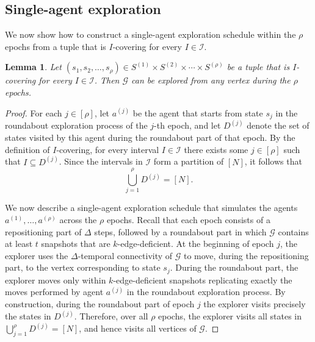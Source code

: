 \documentclass[a4paper,11pt]{article}
\newtheorem{lemma}[theorem]{Lemma}
\theoremstyle{definition}
\theoremstyle{remark}
\newcommand{\cG}{\ensuremath{\mathcal{G}}}
\newcommand{\bfI}{\ensuremath{\mathcal{I}}}
\begin{document}
	 \subsection{Single-agent exploration}\label{sec:single-agent-exploration}
 	
 	We now show how to construct a single-agent exploration schedule within the $\rho$ epochs from 
    a tuple that is  $I$-covering for every $I \in \bfI$.
 	
 	\begin{lemma}\label{lem:tuple-to-exploration}
 		Let $(s_1, s_2, \ldots, s_{\rho}) \in S^{(1)} \times S^{(2)} \times \cdots \times S^{(\rho)}$ be a tuple that is $I$-covering for every $I \in \bfI$. Then $\cG$ can be explored from any vertex during the $\rho$ epochs.
 	\end{lemma}
	\begin{proof}
        For each $j \in [\rho]$, let $a^{(j)}$ be the agent that starts from state $s_j$ in
        the roundabout exploration process of the $j$-th epoch, and let $D^{(j)}$ denote the
        set of states visited by this agent during the roundabout part of that epoch.
        By the definition of $I$-covering, for every interval $I \in \bfI$ there
        exists some $j \in [\rho]$ such that $I \subseteq D^{(j)}$.
        Since the intervals in $\bfI$ form a partition of $[N]$, it follows that
        \[
        \bigcup_{j=1}^{\rho} D^{(j)} = [N].
        \]
        
        We now describe a single-agent exploration schedule that simulates the agents
        $a^{(1)},\dots,a^{(\rho)}$ across the $\rho$ epochs.
        Recall that each epoch consists of a repositioning part of $\Delta$ steps, followed by a roundabout part in which $\cG$ contains at least $t$ snapshots that are $k$-edge-deficient.
        At the beginning of epoch $j$, the explorer uses the $\Delta$-temporal connectivity
        of $\cG$ to move, during the repositioning part, to the vertex corresponding to state
        $s_j$.
        During the roundabout part, the explorer moves only within $k$-edge-deficient snapshots replicating exactly the
        moves performed by agent $a^{(j)}$ in the roundabout exploration process.
%
        By construction, during the roundabout part of epoch $j$ the explorer visits
        precisely the states in $D^{(j)}$.
        Therefore, over all $\rho$ epochs, the explorer visits all states in
        $\bigcup_{j=1}^{\rho} D^{(j)} = [N]$, and hence visits all vertices of $\cG$.
	\end{proof}
 
\end{document}
